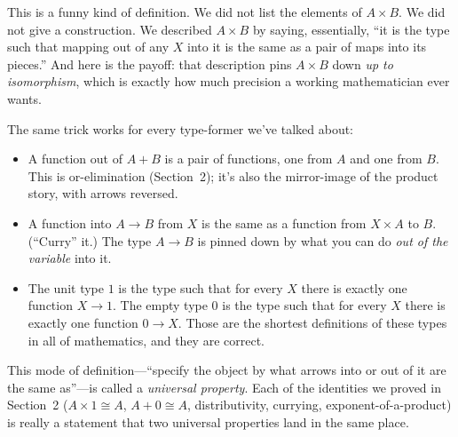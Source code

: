 \documentclass[11pt]{article}
\begin{document}
This is a funny kind of definition. We did not list the elements of $A \times B$. We did not give a construction. We described $A \times B$ by saying, essentially, ``it is the type such that mapping out of any $X$ into it is the same as a pair of maps into its pieces.'' And here is the payoff: that description pins $A \times B$ down \emph{up to isomorphism}, which is exactly how much precision a working mathematician ever wants.

The same trick works for every type-former we've talked about:
\begin{itemize}
  \item A function out of $A + B$ is a pair of functions, one from $A$ and one from $B$. This is or-elimination (Section~2); it's also the mirror-image of the product story, with arrows reversed.
  \item A function into $A \to B$ from $X$ is the same as a function from $X \times A$ to $B$. (``Curry'' it.) The type $A \to B$ is pinned down by what you can do \emph{out of the variable} into it.
  \item The unit type $1$ is the type such that for every $X$ there is exactly one function $X \to 1$. The empty type $0$ is the type such that for every $X$ there is exactly one function $0 \to X$. Those are the shortest definitions of these types in all of mathematics, and they are correct.
\end{itemize}

\begin{center}
\end{center}

This mode of definition---``specify the object by what arrows into or out of it are the same as''---is called a \emph{universal property}. Each of the identities we proved in Section~2 ($A \times 1 \cong A$, $A + 0 \cong A$, distributivity, currying, exponent-of-a-product) is really a statement that two universal properties land in the same place.
\end{document}
